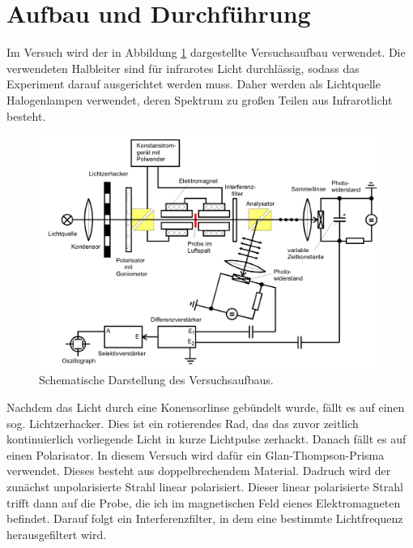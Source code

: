 \section{Aufbau und Durchführung}
\label{sec:aufbauUndDurchfuehrung}

Im Versuch wird der in Abbildung \ref{fig:aufbau} dargestellte Versuchsaufbau verwendet.
Die verwendeten Halbleiter sind für infrarotes Licht durchlässig, sodass das Experiment
darauf ausgerichtet werden muss. Daher werden als Lichtquelle Halogenlampen verwendet,
deren Spektrum zu großen Teilen aus Infrarotlicht besteht.

\begin{figure}
  \centering
  \includegraphics[width=\textwidth]{data/aufbau.png}
  \caption{Schematische Darstellung des Versuchsaufbaus. \cite{anleitung}}
  \label{fig:aufbau}
\end{figure}

Nachdem das Licht durch eine Konensorlinse gebündelt wurde, fällt es auf einen
sog. Lichtzerhacker. Dies ist ein rotierendes Rad, das das zuvor zeitlich kontinuierlich
vorliegende Licht in kurze Lichtpulse zerhackt. Danach fällt es auf einen Polarisator.
In diesem Versuch wird dafür ein Glan-Thompson-Prisma verwendet. Dieses besteht aus
doppelbrechendem Material. Dadruch wird der zunächst unpolarisierte Strahl linear
polarisiert. Dieser linear polarisierte Strahl trifft dann auf die Probe, die ich
im magnetischen Feld eienes Elektromagneten befindet. Darauf folgt ein Interferenzfilter,
in dem eine bestimmte Lichtfrequenz herausgefiltert wird.

\cite{Bitte Glan-Thompson Prisma mit Bild erklären.}

\cite{Bitte Interferenzfilter (grob) mit Bild erklären.}

